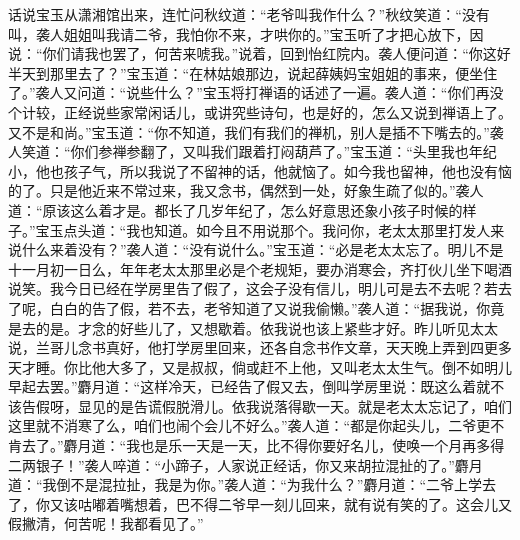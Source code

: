 


\begin{parag}
    话说宝玉从潇湘馆出来，连忙问秋纹道：“老爷叫我作什么？”秋纹笑道：“没有叫，袭人姐姐叫我请二爷，我怕你不来，才哄你的。”宝玉听了才把心放下，因说：“你们请我也罢了，何苦来唬我。”说着，回到怡红院内。袭人便问道：“你这好半天到那里去了？”宝玉道：“在林姑娘那边，说起薛姨妈宝姐姐的事来，便坐住了。”袭人又问道：“说些什么？”宝玉将打禅语的话述了一遍。袭人道：“你们再没个计较，正经说些家常闲话儿，或讲究些诗句，也是好的，怎么又说到禅语上了。又不是和尚。”宝玉道：“你不知道，我们有我们的禅机，别人是插不下嘴去的。”袭人笑道：“你们参禅参翻了，又叫我们跟着打闷葫芦了。”宝玉道：“头里我也年纪小，他也孩子气，所以我说了不留神的话，他就恼了。如今我也留神，他也没有恼的了。只是他近来不常过来，我又念书，偶然到一处，好象生疏了似的。”袭人道：“原该这么着才是。都长了几岁年纪了，怎么好意思还象小孩子时候的样子。”宝玉点头道：“我也知道。如今且不用说那个。我问你，老太太那里打发人来说什么来着没有？”袭人道：“没有说什么。”宝玉道：“必是老太太忘了。明儿不是十一月初一日么，年年老太太那里必是个老规矩，要办消寒会，齐打伙儿坐下喝酒说笑。我今日已经在学房里告了假了，这会子没有信儿，明儿可是去不去呢？若去了呢，白白的告了假，若不去，老爷知道了又说我偷懒。”袭人道：“据我说，你竟是去的是。才念的好些儿了，又想歇着。依我说也该上紧些才好。昨儿听见太太说，兰哥儿念书真好，他打学房里回来，还各自念书作文章，天天晚上弄到四更多天才睡。你比他大多了，又是叔叔，倘或赶不上他，又叫老太太生气。倒不如明儿早起去罢。”麝月道：“这样冷天，已经告了假又去，倒叫学房里说：既这么着就不该告假呀，显见的是告谎假脱滑儿。依我说落得歇一天。就是老太太忘记了，咱们这里就不消寒了么，咱们也闹个会儿不好么。”袭人道：“都是你起头儿，二爷更不肯去了。”麝月道：“我也是乐一天是一天，比不得你要好名儿，使唤一个月再多得二两银子！”袭人啐道：“小蹄子，人家说正经话，你又来胡拉混扯的了。”麝月道：“我倒不是混拉扯，我是为你。”袭人道：“为我什么？”麝月道：“二爷上学去了，你又该咕嘟着嘴想着，巴不得二爷早一刻儿回来，就有说有笑的了。这会儿又假撇清，何苦呢！我都看见了。”
\end{parag}


